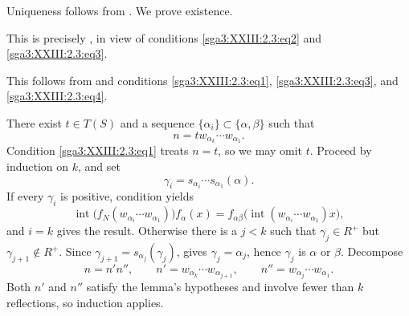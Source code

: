 \SGAProof
Uniqueness follows from . We prove existence.

This is precisely , in view of conditions
\eqref{sga3:XXIII:2.3:eq2} and \eqref{sga3:XXIII:2.3:eq3}.

This follows from  and conditions
\eqref{sga3:XXIII:2.3:eq1}, \eqref{sga3:XXIII:2.3:eq3}, and
\eqref{sga3:XXIII:2.3:eq4}.


There exist \(t\in T(S)\) and a sequence
\(\{\alpha_i\}\subset\{\alpha,\beta\}\) such that
\[
  n=tw_{\alpha_k}\cdots w_{\alpha_1}.
\]
Condition \eqref{sga3:XXIII:2.3:eq1} treats \(n=t\), so we may omit
\(t\). Proceed by induction on \(k\), and set
\[
  \gamma_i=s_{\alpha_i}\cdots s_{\alpha_1}(\alpha).
\]
If every \(\gamma_i\) is positive, condition  yields
\[
  \operatorname{int}\bigl(f_N(w_{\alpha_i}\cdots w_{\alpha_1})\bigr)
     f_\alpha(x)
   =
  f_{\alpha\beta}\bigl(
     \operatorname{int}(w_{\alpha_i}\cdots w_{\alpha_1})x\bigr),
\]
and \(i=k\) gives the result. Otherwise there is a \(j<k\) such that
\(\gamma_j\in R^+\) but \(\gamma_{j+1}\notin R^+\). Since
\(\gamma_{j+1}=s_{\alpha_j}(\gamma_j)\),  gives
\(\gamma_j=\alpha_j\), hence \(\gamma_j\) is \(\alpha\) or \(\beta\).
Decompose
\[
 n=n'n'',\qquad
 n'=w_{\alpha_k}\cdots w_{\alpha_{j+1}},\qquad
 n''=w_{\alpha_j}\cdots w_{\alpha_1}.
\]
Both \(n'\) and \(n''\) satisfy the lemma's hypotheses and involve
fewer than \(k\) reflections, so induction applies.

